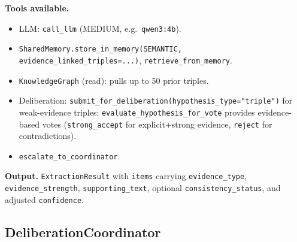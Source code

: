 \documentclass{article}
\begin{document}
\begin{agentbox}
\textbf{Tools available.}
\begin{itemize}[leftmargin=*,nosep]
\item LLM: \texttt{call\_llm} (MEDIUM, e.g.\ \texttt{qwen3:4b}).
\item \texttt{SharedMemory.store\_in\_memory(SEMANTIC, evidence\_linked\_triples=...)}, \texttt{retrieve\_from\_memory}.
\item \texttt{KnowledgeGraph} (read): pulls up to 50 prior triples.
\item Deliberation: \texttt{submit\_for\_deliberation(hypothesis\_type="triple")} for weak-evidence triples; \texttt{evaluate\_hypothesis\_for\_vote} provides evidence-based votes (\texttt{strong\_accept} for explicit+strong evidence, \texttt{reject} for contradictions).
\item \texttt{escalate\_to\_coordinator}.
\end{itemize}

\textbf{Output.} \texttt{ExtractionResult} with \texttt{items} carrying \texttt{evidence\_type}, \texttt{evidence\_strength}, \texttt{supporting\_text}, optional \texttt{consistency\_status}, and adjusted \texttt{confidence}.
\end{agentbox}

\newpage
\subsection{DeliberationCoordinator}
\label{app:deliberation_agent}
\end{document}

